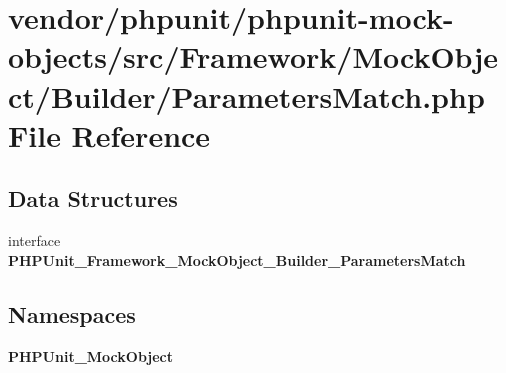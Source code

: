 \section{vendor/phpunit/phpunit-\/mock-\/objects/src/\+Framework/\+Mock\+Object/\+Builder/\+Parameters\+Match.php File Reference}
\label{_parameters_match_8php}
\subsection*{Data Structures}
\begin{DoxyCompactItemize}
\item 
interface {\bf P\+H\+P\+Unit\+\_\+\+Framework\+\_\+\+Mock\+Object\+\_\+\+Builder\+\_\+\+Parameters\+Match}
\end{DoxyCompactItemize}
\subsection*{Namespaces}
\begin{DoxyCompactItemize}
\item 
 {\bf P\+H\+P\+Unit\+\_\+\+Mock\+Object}
\end{DoxyCompactItemize}
